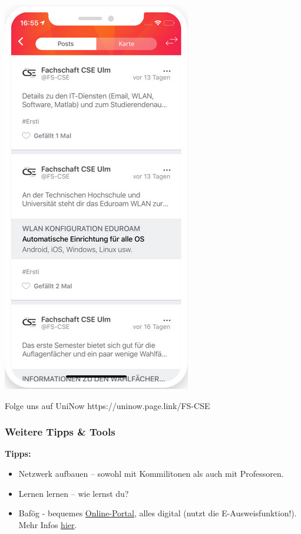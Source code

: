 \documentclass[10pt,a4paper]{beamer}
\begin{document}
\begin{frame}
\begin{center}
            \includegraphics[height=0.7\textheight]{uninow2.png}
        \end{center}
        \begin{block}{Folge uns auf UniNow}
            https://uninow.page.link/FS-CSE
        \end{block}
    \end{frame}

        \begin{frame}
        \frametitle{Weitere Tipps \& Tools}
        \vfill
        \textbf{Tipps:}
        \vfill
        \begin{itemize}
            \item Netzwerk aufbauen – sowohl mit Kommilitonen als auch mit Professoren.
            \vfill
            \item Lernen lernen – wie lernst du?
            \vfill
            \item Bafög - bequemes \href{https://www.bafoeg-digital.de/}{\color{ecs100}Online-Portal}, alles digital (nutzt die E-Ausweisfunktion!). Mehr Infos \href{https://studierendenwerk-ulm.de/bafoeg-finanzen/}{\color{ecs100}hier}.
        \end{itemize}
        \vfill
    \end{frame}
\end{document}
